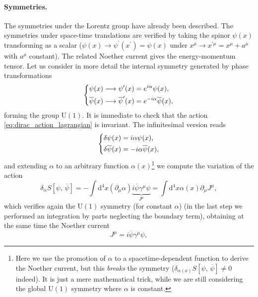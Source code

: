 \paragraph{Symmetries.}
The symmetries under the Lorentz group have already been described. The symmetries under space-time translations are verified by taking the spinor \(\psi(x)\) transforming as a scalar (\(\psi(x) \to \psi^{\prime}(x^{\prime}) = \psi(x)\) under \(x^{\mu} \to x^{\prime \mu} = x^{\mu} + a^{\mu}\) with \(a^{\mu}\) constant). The related Noether current gives the energy-momentum tensor.
Let us consider in more detail the internal symmetry generated by phase transformations
\begin{equation}
    \begin{dcases}
        \psi(x) \longrightarrow \psi^{\prime}(x) = e^{i \alpha} \psi(x), \\
        \overline{\psi}(x) \longrightarrow \overline{\psi}^{\prime}(x) = e^{-i \alpha} \overline{\psi}(x),
    \end{dcases}
    \label{eq:dirac_U1_transformation}
\end{equation}
forming the group \(\mathrm{U}(1)\). It is immediate to check that the action \eqref{eq:dirac_action_lagrangian} is invariant. The infinitesimal version reads
\[
    \begin{dcases}
        \delta \psi(x) = i \alpha \psi(x), \\
        \delta \overline{\psi}(x) = -i \alpha \overline{\psi}(x),
    \end{dcases}
\]
and extending \(\alpha\) to an arbitrary function \(\alpha(x)\)\footnote{Here we use the promotion of \(\alpha\) to a spacetime-dependent function to derive the Noether current, but this \textit{breaks} the symmetry (\(\delta_{\alpha(x)}S[\psi,\,\overline{\psi}] \neq 0\) indeed). It is just a mere mathematical trick, while we are still considering the global \(\mathrm{U}(1)\) symmetry where \(\alpha\) is constant.} we compute the variation of the action
\[
    \delta_{\alpha} S [\psi,\,\overline{\psi}] = - \int \mathrm{d}^4 x (\partial_\mu \alpha) \underbrace{i \overline{\psi} \gamma^{\mu} \psi}_{J^{\mu}} = \int \mathrm{d}^4 x \alpha(x) \partial_{\mu} J^{\mu},
\]
which verifies again the \(\mathrm{U}(1)\) symmetry (for constant \(\alpha\)) (in the last step we performed an integration by parts neglecting the boundary term), obtaining at the same time the Noether current
\begin{equation}
    J^{\mu} = i \overline{\psi} \gamma^{\mu} \psi,
    \label{eq:dirac_noether_current_u1}
\end{equation}

